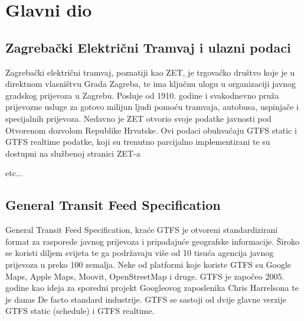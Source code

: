 \documentclass[zavrsnirad]{fer}
\begin{document}



\chapter{Glavni dio}
\label{pog:glavni_dio}

\section{Zagrebački Električni Tramvaj i ulazni podaci}

Zagrebački električni tramvaj, poznatiji kao ZET, je trgovačko društvo koje je u direktnom
vlasništvu Grada Zagreba, te ima ključnu ulogu u organizaciji javnog gradskog prijevoza u Zagrebu.
Posluje od 1910. godine i svakodnevno pruža prijevozne usluge za gotovo milijun ljudi pomoću
tramvaja, autobusa, uspinjače i specijalnih prijevoza. Nedavno je ZET otvorio svoje podatke javnosti
pod Otvorenom dozvolom Republike Hrvatske. Ovi podaci obuhvaćaju GTFS static i GTFS realtime
podatke, koji su trenutno parcijalno implementirani te su dostupni na službenoj stranici ZET-a

etc...

\section[GTFS]{General Transit Feed Specification}

General Transit Feed Specification, kraće GTFS je otvoreni standardizirani format za rasporede
javnog prijevoza i pripadajuće geografske informacije. Široko se koristi diljem svijeta te ga
podržavaju više od 10 tisuća agencija javnog prijevoza u preko 100 zemalja. Neke od platformi koje
koriste GTFS su Google Maps, Apple Maps, Moovit, OpenStreetMap i druge. GTFS je započeo
2005. godine kao ideja za sporedni projekt Googleovog zaposlenika Chris Harrelsona te je danas De
facto standard industrije. GTFS se sastoji od dvije glavne verzije GTFS static (schedule) i GTFS
realtime.
\end{document}
